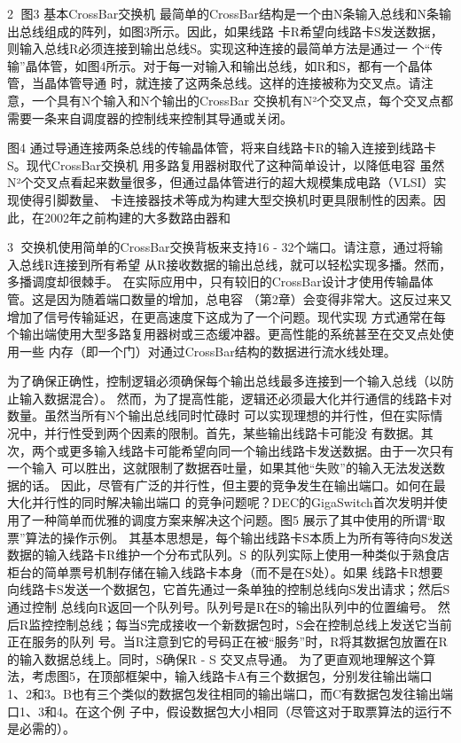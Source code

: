                                                     2
图3 基本CrossBar交换机
最简单的CrossBar结构是一个由N条输入总线和N条输出总线组成的阵列，如图3所示。因此，如果线路
卡R希望向线路卡S发送数据，则输入总线R必须连接到输出总线S。实现这种连接的最简单方法是通过一
个“传输”晶体管，如图4所示。对于每一对输入和输出总线，如R和S，都有一个晶体管，当晶体管导通
时，就连接了这两条总线。这样的连接被称为交叉点。请注意，一个具有N个输入和N个输出的CrossBar
交换机有N²个交叉点，每个交叉点都需要一条来自调度器的控制线来控制其导通或关闭。




图4 通过导通连接两条总线的传输晶体管，将来自线路卡R的输入连接到线路卡S。现代CrossBar交换机
用多路复用器树取代了这种简单设计，以降低电容
虽然N²个交叉点看起来数量很多，但通过晶体管进行的超大规模集成电路（VLSI）实现使得引脚数量、
卡连接器技术等成为构建大型交换机时更具限制性的因素。因此，在2002年之前构建的大多数路由器和


                                                  3
交换机使用简单的CrossBar交换背板来支持16 - 32个端口。请注意，通过将输入总线R连接到所有希望
从R接收数据的输出总线，就可以轻松实现多播。然而，多播调度却很棘手。
在实际应用中，只有较旧的CrossBar设计才使用传输晶体管。这是因为随着端口数量的增加，总电容
（第2章）会变得非常大。这反过来又增加了信号传输延迟，在更高速度下这成为了一个问题。现代实现
方式通常在每个输出端使用大型多路复用器树或三态缓冲器。更高性能的系统甚至在交叉点处使用一些
内存（即一个门）对通过CrossBar结构的数据进行流水线处理。

为了确保正确性，控制逻辑必须确保每个输出总线最多连接到一个输入总线（以防止输入数据混合）。
然而，为了提高性能，逻辑还必须最大化并行通信的线路卡对数量。虽然当所有N个输出总线同时忙碌时
可以实现理想的并行性，但在实际情况中，并行性受到两个因素的限制。首先，某些输出线路卡可能没
有数据。其次，两个或更多输入线路卡可能希望向同一个输出线路卡发送数据。由于一次只有一个输入
可以胜出，这就限制了数据吞吐量，如果其他“失败”的输入无法发送数据的话。
因此，尽管有广泛的并行性，但主要的竞争发生在输出端口。如何在最大化并行性的同时解决输出端口
的竞争问题呢？DEC的GigaSwitch首次发明并使用了一种简单而优雅的调度方案来解决这个问题。图5
展示了其中使用的所谓“取票”算法的操作示例。
其基本思想是，每个输出线路卡S本质上为所有等待向S发送数据的输入线路卡R维护一个分布式队列。S
的队列实际上使用一种类似于熟食店柜台的简单票号机制存储在输入线路卡本身（而不是在S处）。如果
线路卡R想要向线路卡S发送一个数据包，它首先通过一条单独的控制总线向S发出请求；然后S通过控制
总线向R返回一个队列号。队列号是R在S的输出队列中的位置编号。
然后R监控控制总线；每当S完成接收一个新数据包时，S会在控制总线上发送它当前正在服务的队列
号。当R注意到它的号码正在被“服务”时，R将其数据包放置在R的输入数据总线上。同时，S确保R - S
交叉点导通。
为了更直观地理解这个算法，考虑图5，在顶部框架中，输入线路卡A有三个数据包，分别发往输出端口
1、2和3。B也有三个类似的数据包发往相同的输出端口，而C有数据包发往输出端口1、3和4。在这个例
子中，假设数据包大小相同（尽管这对于取票算法的运行不是必需的）。




